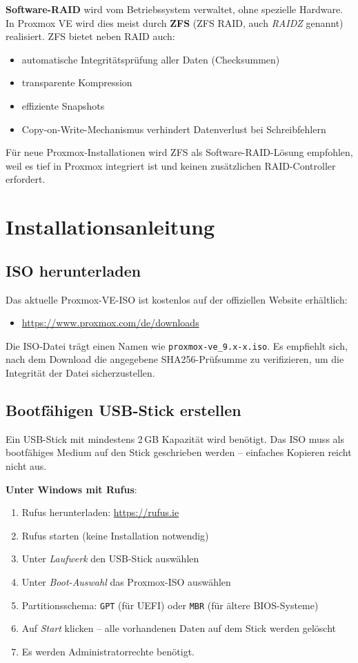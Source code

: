 \documentclass[11pt, oneside, numbers=noenddot]{scrbook}
\begin{document}
\textbf{Software-RAID} wird vom Betriebssystem verwaltet, ohne spezielle Hardware. In Proxmox VE wird dies meist durch \textbf{ZFS} (ZFS RAID, auch \textit{RAIDZ} genannt) realisiert. ZFS bietet neben RAID auch:
\begin{itemize}
  \item automatische Integritätsprüfung aller Daten (Checksummen)
  \item transparente Kompression
  \item effiziente Snapshots
  \item Copy-on-Write-Mechanismus verhindert Datenverlust bei Schreibfehlern
\end{itemize}

Für neue Proxmox-Installationen wird ZFS als Software-RAID-Lösung empfohlen, weil es tief in Proxmox integriert ist und keinen zusätzlichen RAID-Controller erfordert.



\chapter{Installationsanleitung}

\section{ISO herunterladen}
Das aktuelle Proxmox-VE-ISO ist kostenlos auf der offiziellen Website erhältlich:
\begin{itemize}
  \item \href{https://www.proxmox.com/de/downloads}{https://www.proxmox.com/de/downloads}
\end{itemize}

Die ISO-Datei trägt einen Namen wie \texttt{proxmox-ve\_9.x-x.iso}. Es empfiehlt sich, nach dem Download die angegebene SHA256-Prüfsumme zu verifizieren, um die Integrität der Datei sicherzustellen.

\section{Bootfähigen USB-Stick erstellen}
Ein USB-Stick mit mindestens 2\,GB Kapazität wird benötigt. Das ISO muss als bootfähiges Medium auf den Stick geschrieben werden -- einfaches Kopieren reicht nicht aus.

\textbf{Unter Windows mit Rufus}:
\begin{enumerate}
  \item Rufus herunterladen: \href{https://rufus.ie}{https://rufus.ie}
  \item Rufus starten (keine Installation notwendig)
  \item Unter \textit{Laufwerk} den USB-Stick auswählen
  \item Unter \textit{Boot-Auswahl} das Proxmox-ISO auswählen
  \item Partitionsschema: \texttt{GPT} (für UEFI) oder \texttt{MBR} (für ältere BIOS-Systeme)
  \item Auf \textit{Start} klicken -- alle vorhandenen Daten auf dem Stick werden gelöscht
  \item Es werden Administratorrechte benötigt.
\end{enumerate}
\end{document}
